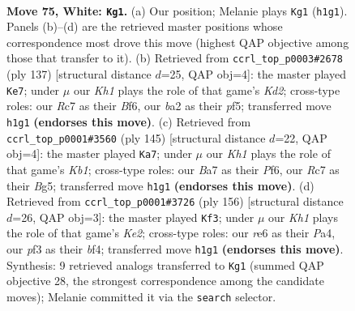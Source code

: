 \documentclass[11pt]{article}
\begin{document}
\clearpage

\begin{figure}[p]\centering
\begin{subfigure}{0.46\textwidth}\centering
\resizebox{\linewidth}{!}{%
\newchessgame
\chessboard[
  setfen={6k1/B1R5/4r3/8/B3p2p/5p1P/b4P2/7K w - - 60 75},
  showmover=false,
  pgfstyle=straightmove, color=movearrow, markmove={h1-g1}
]}
\caption{}
\end{subfigure}\hfill
\begin{subfigure}{0.46\textwidth}\centering
\resizebox{\linewidth}{!}{%
\newchessgame
\chessboard[
  setfen={8/p2k4/1p3b2/1P3P1B/P4K1p/7P/8/8 b - - 13 69},
  showmover=false,
  pgfstyle=straightmove, color=movearrow, markmove={d7-e7}
]}
\caption{}
\end{subfigure}
\\[4pt]
\begin{subfigure}{0.46\textwidth}\centering
\resizebox{\linewidth}{!}{%
\newchessgame
\chessboard[
  setfen={1k6/3K4/1p3p2/5Pb1/PP4Pp/7B/8/8 b - - 4 73},
  showmover=false,
  pgfstyle=straightmove, color=movearrow, markmove={b8-a7}
]}
\caption{}
\end{subfigure}\hfill
\begin{subfigure}{0.46\textwidth}\centering
\resizebox{\linewidth}{!}{%
\newchessgame
\chessboard[
  setfen={8/8/2B5/p3p3/P3Pb1p/7P/2k1K3/8 w - - 53 79},
  showmover=false,
  pgfstyle=straightmove, color=movearrow, markmove={e2-f3}
]}
\caption{}
\end{subfigure}
\caption{\textbf{Move 75, White: \texttt{Kg1}.} (a) Our position; Melanie plays \texttt{Kg1} (\texttt{h1g1}). Panels (b)--(d) are the retrieved master positions whose correspondence most drove this move (highest QAP objective among those that transfer to it). (b) Retrieved from \texttt{ccrl\_top\_p0003\#2678} (ply 137) [structural distance $d$=25, QAP obj=4]: the master played \texttt{Ke7}; under $\mu$ our \emph{Kh1} plays the role of that game's \emph{Kd2}; cross-type roles: our \emph{R}c7 as their \emph{B}f6, our \emph{b}a2 as their \emph{p}f5; transferred move \texttt{h1g1} \textbf{(endorses this move)}. (c) Retrieved from \texttt{ccrl\_top\_p0001\#3560} (ply 145) [structural distance $d$=22, QAP obj=4]: the master played \texttt{Ka7}; under $\mu$ our \emph{Kh1} plays the role of that game's \emph{Kb1}; cross-type roles: our \emph{B}a7 as their \emph{P}f6, our \emph{R}c7 as their \emph{B}g5; transferred move \texttt{h1g1} \textbf{(endorses this move)}. (d) Retrieved from \texttt{ccrl\_top\_p0001\#3726} (ply 156) [structural distance $d$=26, QAP obj=3]: the master played \texttt{Kf3}; under $\mu$ our \emph{Kh1} plays the role of that game's \emph{Ke2}; cross-type roles: our \emph{r}e6 as their \emph{P}a4, our \emph{p}f3 as their \emph{b}f4; transferred move \texttt{h1g1} \textbf{(endorses this move)}. Synthesis: 9 retrieved analogs transferred to \texttt{Kg1} (summed QAP objective 28, the strongest correspondence among the candidate moves); Melanie committed it via the \texttt{search} selector.}
\label{fig:thought-m148}
\end{figure}
\end{document}
